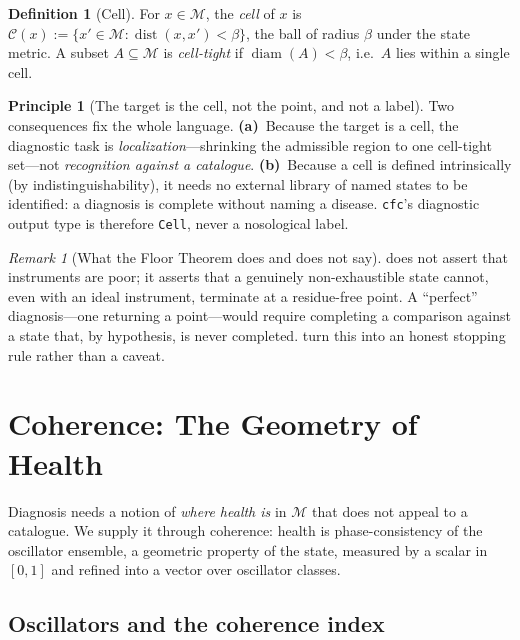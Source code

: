 \documentclass[11pt,a4paper]{article}
\theoremstyle{cfcthm}
\theoremstyle{definition}
\newtheorem{definition}[theorem]{Definition}
\newtheorem{principle}[theorem]{Principle}
\theoremstyle{remark}
\newtheorem{remark}[theorem]{Remark}
\newcommand{\Man}{\mathcal{M}}          %
\newcommand{\st}{x}                     %
\newcommand{\flo}{\beta}                %
\newcommand{\cell}{\mathcal{C}}         %
\newcommand{\set}[1]{\{#1\}}
\newcommand{\diam}{\operatorname{diam}}
\newcommand{\dist}{\operatorname{dist}}
\newcommand{\cf}[1]{\texttt{#1}}
\begin{document}
\begin{definition}[Cell]
\label{def:cell}
For $\st\in\Man$, the \emph{cell} of $\st$ is
$\cell(\st):=\set{\st'\in\Man:\dist(\st,\st')<\flo}$, the ball of radius
$\flo$ under the state metric. A subset $A\subseteq\Man$ is \emph{cell-tight}
if $\diam(A)<\flo$, i.e.\ $A$ lies within a single cell.
\end{definition}

\begin{principle}[The target is the cell, not the point, and not a label]
\label{prin:goal}
Two consequences fix the whole language. \textbf{(a)}~Because the target is a
cell, the diagnostic task is \emph{localization}---shrinking the admissible
region to one cell-tight set---not \emph{recognition against a catalogue}.
\textbf{(b)}~Because a cell is defined intrinsically (by indistinguishability),
it needs no external library of named states to be identified: a diagnosis is
complete without naming a disease. \cf{cfc}'s diagnostic output type is
therefore \cf{Cell}, never a nosological label.
\end{principle}

\begin{remark}[What the Floor Theorem does and does not say]
\label{rem:floor-scope}
 does not assert that instruments are poor; it asserts that a
genuinely non-exhaustible state cannot, even with an ideal instrument,
terminate at a residue-free point. A ``perfect'' diagnosis---one returning a
point---would require completing a comparison against a state that, by
hypothesis, is never completed.  turn this into
an honest stopping rule rather than a caveat.
\end{remark}

\section{Coherence: The Geometry of Health}
\label{sec:coherence}

Diagnosis needs a notion of \emph{where health is} in $\Man$ that does not
appeal to a catalogue. We supply it through coherence: health is
phase-consistency of the oscillator ensemble, a geometric property of the
state, measured by a scalar in $[0,1]$ and refined into a vector over
oscillator classes.

\subsection{Oscillators and the coherence index}
\end{document}
